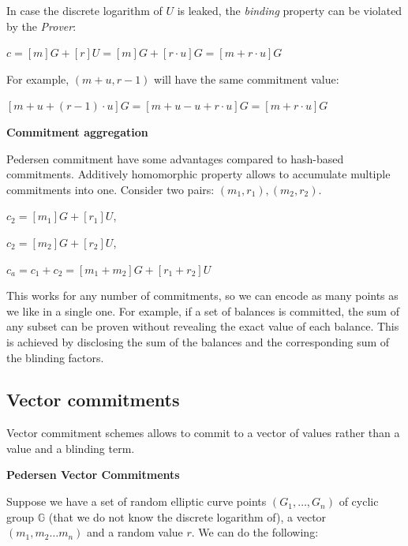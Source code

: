 \documentclass[../lecture-notes-148x210.tex]{subfiles}
\begin{document}
\begin{remark}
    In case the discrete logarithm of $U$ is leaked, the \textit{binding} property can be violated by the \textit{Prover}:

    \begin{center}
        $c = [m]G + [r]U = [m] G + [r \cdot u]G = [m + r \cdot u] G$
    \end{center}

    For example, $(m + u, r - 1)$ will have the same commitment value:

    \begin{center}
        $[m+u + (r-1) \cdot u] G = [m + u - u + r \cdot u] G = [m + r \cdot u] G$     
    \end{center}
    
        
\end{remark}

\textbf{Commitment aggregation}

Pedersen commitment have some advantages compared to hash-based commitments.
Additively homomorphic property allows to accumulate multiple commitments into one.
Consider two pairs: $(m_1, r_1), (m_2, r_2)$.

\begin{center}
    $c_2 = [m_1]G + [r_1]U$,

    $c_2 = [m_2]G + [r_2]U$,

    $c_a = c_1 + c_2 = [m_1 + m_2]G + [r_1 + r_2]U$
\end{center}

This works for any number of commitments, so we can encode as many points as we like in a single one.
For example, if a set of balances is committed, the sum of any subset can be proven without revealing the exact value of each balance. 
This is achieved by disclosing the sum of the balances and the corresponding sum of the blinding factors.

\subsection{Vector commitments}

Vector commitment schemes allows to commit to a vector of values rather than a value and a blinding term.

\textbf{Pedersen Vector Commitments}

Suppose we have a set of random elliptic curve points $(G_1, \ldots ,G_n)$ of cyclic group $\mathbb{G}$ 
(that we do not know the discrete logarithm of), a vector $(m_1, m_2 \ldots m_n)$ and a random value $r$. We can do the following:
\end{document}
